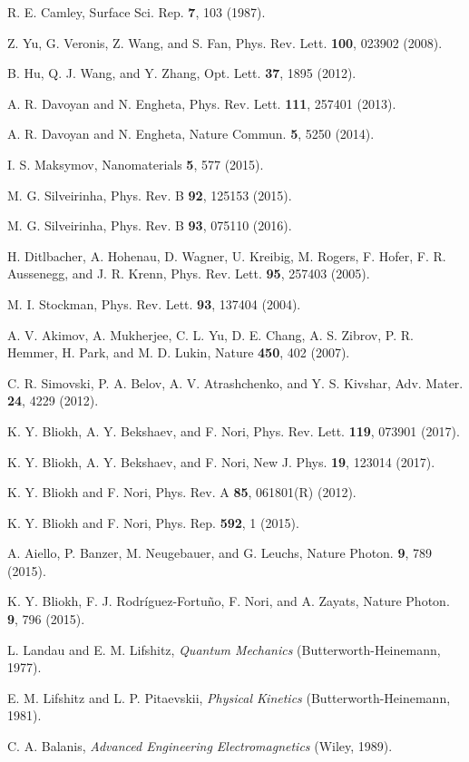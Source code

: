\documentclass[9pt,twocolumn,twoside]{osajnl}
\begin{document}
\begin{thebibliography}{1}
{R. E. Camley, Surface Sci. Rep. {\bf 7}, 103 (1987).}

{Z. Yu, G. Veronis, Z. Wang, and S. Fan, Phys. Rev. Lett. {\bf 100}, 023902 (2008).}

{B. Hu, Q. J. Wang, and Y. Zhang, Opt. Lett. {\bf 37}, 1895 (2012).}

{A. R. Davoyan and N. Engheta, Phys. Rev. Lett. {\bf 111}, 257401 (2013).}

{A. R. Davoyan and N. Engheta, Nature Commun. {\bf 5}, 5250 (2014).}

{I. S. Maksymov, Nanomaterials {\bf 5}, 577 (2015).}

{M. G. Silveirinha, Phys. Rev. B {\bf 92}, 125153 (2015).}

{M. G. Silveirinha, Phys. Rev. B {\bf 93}, 075110 (2016).}

{H. Ditlbacher, A. Hohenau, D. Wagner, U. Kreibig, M. Rogers, F. Hofer, F. R. Aussenegg, and J. R. Krenn, Phys. Rev. Lett. {\bf 95}, 257403 (2005).}

{M. I. Stockman, Phys. Rev. Lett. {\bf 93}, 137404 (2004).}

{A. V. Akimov,  A. Mukherjee, C. L. Yu, D. E. Chang, A. S. Zibrov, P. R. Hemmer, H. Park, and M. D. Lukin, Nature {\bf 450}, 402 (2007).}

{C. R. Simovski, P. A. Belov, A. V. Atrashchenko, and Y. S. Kivshar, Adv. Mater. {\bf 24}, 4229 (2012).}

{K. Y. Bliokh, A. Y. Bekshaev, and F. Nori, Phys. Rev. Lett. {\bf 119}, 073901 (2017).}

{K. Y. Bliokh, A. Y. Bekshaev, and F. Nori, New J. Phys. {\bf 19}, 123014 (2017).}

{K. Y. Bliokh and F. Nori, Phys. Rev. A {\bf 85}, 061801(R) (2012).}

{K. Y. Bliokh and F. Nori, Phys. Rep. {\bf 592}, 1 (2015).}

{A. Aiello, P. Banzer, M. Neugebauer, and G. Leuchs, Nature Photon. {\bf 9}, 789 (2015).}

{K. Y. Bliokh, F. J. Rodr\'{i}guez-Fortu\~{n}o, F. Nori, and A. Zayats, Nature Photon. {\bf 9}, 796 (2015).}

{L. Landau and E. M. Lifshitz, {\it Quantum Mechanics} (Butterworth-Heinemann, 1977).}

{E. M. Lifshitz and L. P. Pitaevskii, {\it Physical Kinetics} (Butterworth-Heinemann, 1981).}

{C. A. Balanis, {\it Advanced Engineering Electromagnetics} (Wiley, 1989).}





\end{thebibliography}
\end{document}
